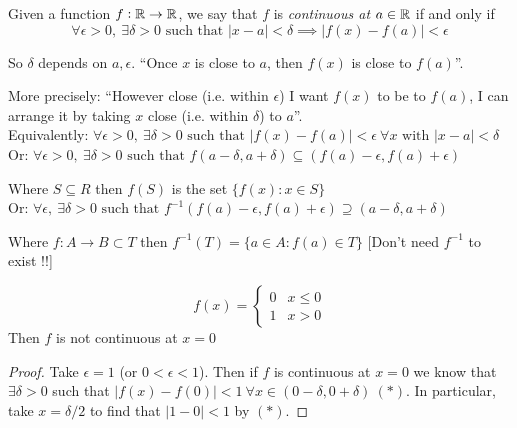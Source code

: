 \setcounter{lecture}{3}

\pagebreak

\label{sub:series}


\begin{definition}
	Given a function $f: \mathbb{R} \to \mathbb{R}$, we say that $f$ is \emph{continuous at $a \in \mathbb{R}$} if and only if 
	\[\forall \epsilon >0, ~\exists \delta >0 \text{ such that } |x-a| < \delta \implies |f(x) - f(a)| < \epsilon \]
\end{definition}

So $\delta$ depends on $a, \epsilon$. ``Once $x$ is close to $a$, then $f(x)$ is close to $f(a)$''.

More precisely: ``However close (i.e. within $\epsilon$) I want $f(x)$ to be to $f(a)$, I can arrange it by taking $x$ close (i.e. within $\delta$) to $a$''.\\

Equivalently: $\forall \epsilon > 0,~ \exists \delta >0 \text{ such that } |f(x) - f(a)| < \epsilon ~ \forall x \text{ with } |x-a| < \delta$\\

Or: $\forall \epsilon > 0, ~ \exists \delta > 0 \text{ such that } f(a- \delta, a + \delta) \subseteq (f(a)- \epsilon, f(a) + \epsilon)$

Where $S\subseteq R$ then $f(S)$ is the set $\{f(x):x \in S\}$\\

Or: $\forall \epsilon,~\exists \delta >0 \text{ such that } f^{-1}(f(a) - \epsilon, f(a) + \epsilon) \supseteq (a - \delta, a + \delta)$

Where $f: A \to B \subset T$ then $f^{-1}(T) = \{a \in A:f(a) \in T\}$ [Don't need $f^{-1}$ to exist !!]\\


\begin{example}
\[f(x) = \begin{cases}
 0 & x \leq 0 \\
 1 & x > 0	
 \end{cases}
\]	 Then $f$ is not continuous at $x = 0$

\begin{proof}
Take $\epsilon = 1$ (or $0 < \epsilon < 1$). Then if $f$ is continuous at $x = 0$ we know that $\exists \delta > 0$ such that $|f(x) - f(0)| < 1~ \forall x \in (0 - \delta, 0 + \delta)~(*)$. In particular, take $x = \delta/2$ to find that $|1-0| < 1$ by 	$(*)$.
\end{proof}
\end{example}

